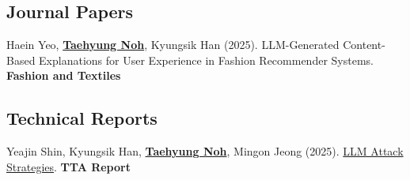 \documentclass[a4paper,11pt]{article}
\begin{document}
\subsection*{\textbf{Journal Papers}}
\vspace{-2mm}
\small{
\begin{enumerate}[leftmargin=*, labelsep=0.5em, align=left, widest={[\textbf{J.1}]}, itemindent=0em, label={\textbf{[J.\arabic*]}}]

\item Haein Yeo, \underline{\textbf{Taehyung Noh}}, Kyungsik Han (2025). LLM-Generated Content-Based Explanations for User Experience in Fashion Recommender Systems. \textbf{Fashion and Textiles}

\end{enumerate}
}

\subsection*{\textbf{Technical Reports}}
\vspace{-2mm}
\small{
\begin{enumerate}[leftmargin=*, labelsep=0.5em, align=left, widest={[\textbf{R.1}]}, itemindent=0em, label={\textbf{[R.\arabic*]}}]

\item Yeajin Shin, Kyungsik Han, \underline{\textbf{Taehyung Noh}}, Mingon Jeong (2025). \href{https://astlyi.s3.ap-northeast-2.amazonaws.com/2025/TTA_LLM+\%E1\%84\%8B\%E1\%85\%B2\%E1\%84\%92\%E1\%85\%A2\%E1\%84\%89\%E1\%85\%A5\%E1\%86\%BC+\%E1\%84\%80\%E1\%85\%A9\%E1\%86\%BC\%E1\%84\%80\%E1\%85\%A7\%E1\%86\%A8+\%E1\%84\%8C\%E1\%85\%A5\%E1\%86\%AB\%E1\%84\%85\%E1\%85\%A3\%E1\%86\%A8\%E1\%84\%8B\%E1\%85\%A6+\%E1\%84\%83\%E1\%85\%A2\%E1\%84\%92\%E1\%85\%A1\%E1\%86\%AB+\%E1\%84\%89\%E1\%85\%B5\%E1\%86\%AF\%E1\%84\%8C\%E1\%85\%B3\%E1\%86\%BC\%E1\%84\%8C\%E1\%85\%A5\%E1\%86\%A8+\%E1\%84\%87\%E1\%85\%AE\%E1\%86\%AB\%E1\%84\%89\%E1\%85\%A5\%E1\%86\%A8.pdf}{LLM Attack Strategies}. \textbf{TTA Report}

\end{enumerate}
}
\vspace{-3mm}
\end{document}
